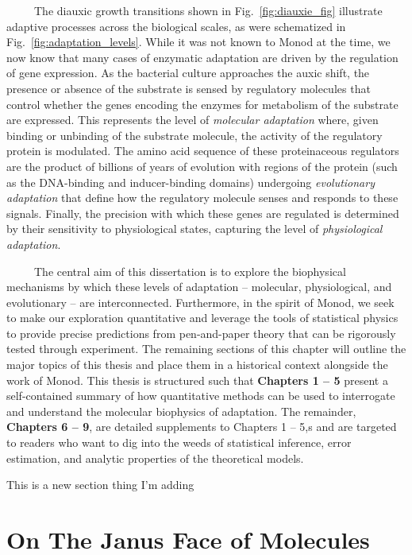 \documentclass[12pt]{caltech_thesis}
\begin{document}
~~~~~The diauxic growth transitions shown in Fig.~\ref{fig:diauxie_fig}
illustrate adaptive processes across the biological scales, as were
schematized in Fig.~\ref{fig:adaptation_levels}. While it was not known
to Monod at the time, we now know that many cases of enzymatic
adaptation are driven by the regulation of gene expression. As the
bacterial culture approaches the auxic shift, the presence or absence of
the substrate is sensed by regulatory molecules that control whether the
genes encoding the enzymes for metabolism of the substrate are
expressed. This represents the level of \emph{molecular adaptation}
where, given binding or unbinding of the substrate molecule, the
activity of the regulatory protein is modulated. The amino acid sequence
of these proteinaceous regulators are the product of billions of years
of evolution with regions of the protein (such as the DNA-binding and
inducer-binding domains) undergoing \emph{evolutionary adaptation} that
define how the regulatory molecule senses and responds to these signals.
Finally, the precision with which these genes are regulated is
determined by their sensitivity to physiological states, capturing the
level of \emph{physiological adaptation}.

~~~~~The central aim of this dissertation is to explore the biophysical
mechanisms by which these levels of adaptation -- molecular,
physiological, and evolutionary -- are interconnected. Furthermore, in
the spirit of Monod, we seek to make our exploration quantitative and
leverage the tools of statistical physics to provide precise predictions
from pen-and-paper theory that can be rigorously tested through
experiment. The remaining sections of this chapter will outline the
major topics of this thesis and place them in a historical context
alongside the work of Monod. This thesis is structured such that
\textbf{Chapters 1 -- 5} present a self-contained summary of how
quantitative methods can be used to interrogate and understand the
molecular biophysics of adaptation. The remainder, \textbf{Chapters 6 --
9}, are detailed supplements to Chapters 1 -- 5,s and are targeted to
readers who want to dig into the weeds of statistical inference, error
estimation, and analytic properties of the theoretical models.

This is a new section thing I'm adding

\hypertarget{on-the-janus-face-of-molecules}{%
\section{On The Janus Face of
Molecules}\label{on-the-janus-face-of-molecules}}
\end{document}
